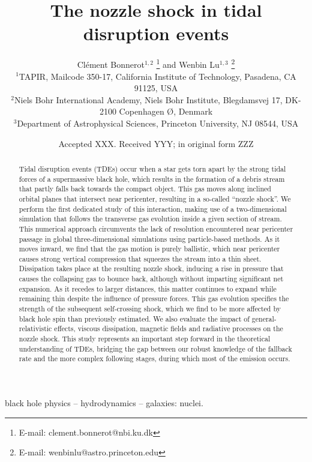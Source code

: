 \documentclass[a4paper,fleqn,usenatbib]{mnras}
\title[Nozzle shock in TDEs]{The nozzle shock in tidal disruption events}
\author[C. Bonnerot and W. Lu]{Clément Bonnerot$^{1,2}$%
\thanks{E-mail: clement.bonnerot@nbi.ku.dk} and Wenbin Lu$^{1,3}$%
\thanks{E-mail: wenbinlu@astro.princeton.edu}
\\
$^{1}$TAPIR, Mailcode 350-17, California Institute of Technology, Pasadena, CA 91125, USA\\
$^{2}$Niels Bohr International Academy, Niels Bohr Institute, Blegdamsvej 17, DK-2100 Copenhagen Ø, Denmark\\
$^{3}$Department of Astrophysical Sciences, Princeton University, NJ 08544, USA\\
}
\date{Accepted XXX. Received YYY; in original form ZZZ}
\begin{document}
\label{firstpage}
\pagerange{\pageref{firstpage}--\pageref{lastpage}}
\maketitle

\begin{abstract}

Tidal disruption events (TDEs) occur when a star gets torn apart by the strong tidal forces of a supermassive black hole, which results in the formation of a debris stream that partly falls back towards the compact object. This gas moves along inclined orbital planes that intersect near pericenter, resulting in a so-called ``nozzle shock''. We perform the first dedicated study of this interaction, making use of a two-dimensional simulation that follows the transverse gas evolution inside a given section of stream. This numerical approach circumvents the lack of resolution encountered near pericenter passage in global three-dimensional simulations using particle-based methods. As it moves inward, we find that the gas motion is purely ballistic, which near pericenter causes strong vertical compression that squeezes the stream into a thin sheet. Dissipation takes place at the resulting nozzle shock, inducing a rise in pressure that causes the collapsing gas to bounce back, although without imparting significant net expansion. As it recedes to larger distances, this matter continues to expand while remaining thin despite the influence of pressure forces. This gas evolution specifies the strength of the subsequent self-crossing shock, which we find to be more affected by black hole spin than previously estimated. We also evaluate the impact of general-relativistic effects, viscous dissipation, magnetic fields and radiative processes on the nozzle shock. This study represents an important step forward in the theoretical understanding of TDEs, bridging the gap between our robust knowledge of the fallback rate and the more complex following stages, during which most of the emission occurs.







\end{abstract}




\begin{keywords}
black hole physics -- hydrodynamics -- galaxies: nuclei.
\end{keywords}
\end{document}

